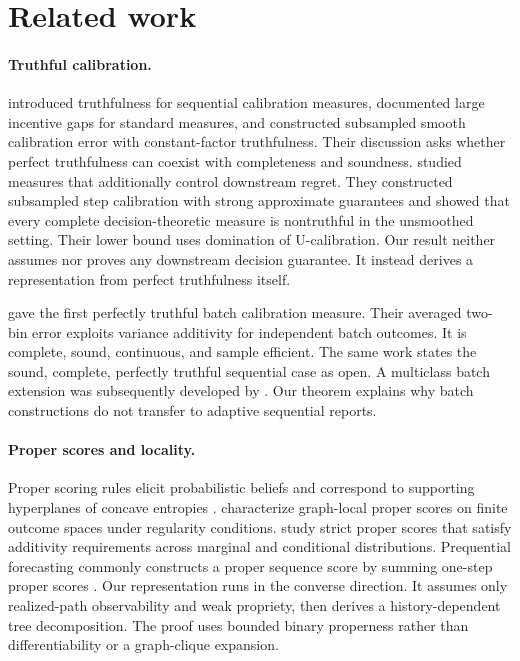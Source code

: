 \documentclass{article}
\theoremstyle{definition}
\theoremstyle{remark}
\newcommand{\1}{\mathbf 1}
\begin{document}
\section{Related work}

\paragraph{Truthful calibration.} \citet{haghtalab2024truthfulness} introduced truthfulness for sequential calibration measures, documented large incentive gaps for standard measures, and constructed subsampled smooth calibration error with constant-factor truthfulness. Their discussion asks whether perfect truthfulness can coexist with completeness and soundness. \citet{qiao2025decision} studied measures that additionally control downstream regret. They constructed subsampled step calibration with strong approximate guarantees and showed that every complete decision-theoretic measure is nontruthful in the unsmoothed setting. Their lower bound uses domination of U-calibration. Our result neither assumes nor proves any downstream decision guarantee. It instead derives a representation from perfect truthfulness itself.

\citet{hartline2026perfect} gave the first perfectly truthful batch calibration measure. Their averaged two-bin error exploits variance additivity for independent batch outcomes. It is complete, sound, continuous, and sample efficient. The same work states the sound, complete, perfectly truthful sequential case as open. A multiclass batch extension was subsequently developed by \citet{lu2025multiclass}. Our theorem explains why batch constructions do not transfer to adaptive sequential reports.

\paragraph{Proper scores and locality.} Proper scoring rules elicit probabilistic beliefs and correspond to supporting hyperplanes of concave entropies \citep{gneiting2007strictly,waghmare2026proper}. \citet{dawid2012local} characterize graph-local proper scores on finite outcome spaces under regularity conditions. \citet{smith2020additive} study strict proper scores that satisfy additivity requirements across marginal and conditional distributions. Prequential forecasting commonly constructs a proper sequence score by summing one-step proper scores \citep{pacchiardi2024probabilistic}. Our representation runs in the converse direction. It assumes only realized-path observability and weak propriety, then derives a history-dependent tree decomposition. The proof uses bounded binary properness rather than differentiability or a graph-clique expansion.
\end{document}
